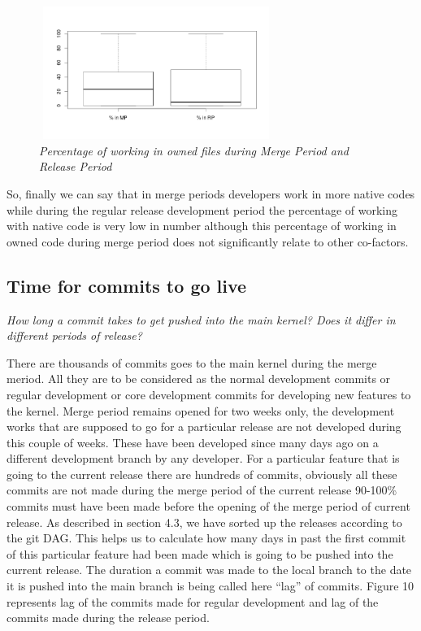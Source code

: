 \documentclass{acm_proc_article-sp}
\begin{document}
\begin{figure}
\begin{center}
\includegraphics[height=1.7in,width=3in]{ownpMPRPbox.png}
\caption{\small \sl Percentage of working in owned files during Merge Period and Release Period}
\end{center}
\end{figure}

So, finally we can say that in merge periods developers work in more native codes while during the regular release development period the percentage of working with native code is very low in number although this percentage of working in owned code during merge period does not significantly relate to other co-factors.

\subsection{Time for commits to go live}
\textit{How long a commit takes to get pushed into the main kernel? Does it differ in different periods of release?}

There are thousands of commits goes to the main kernel during the merge meriod. All they are to be considered as the normal development commits or regular development or core development commits for developing new features to the kernel. Merge period remains opened for two weeks only, the development works that are supposed to go for a particular release are not developed during this couple of weeks. These have been developed since many days ago on a different development branch by any developer. For a particular feature that is going to the current release there are hundreds of commits, obviously all these commits are not made during the merge period of the current release 90-100\% commits must have been made before the opening of the merge period of current release. As described in section 4.3, we have sorted up the releases according to the git DAG. This helps us to calculate how many days in past the first commit of this particular feature had been made which is going to be pushed into the current release. The duration a commit was made to the local branch to the date it is pushed into the main branch is being called here ``lag'' of commits. Figure 10 represents lag of the commits made for regular development and lag of the commits made during the release period.
\end{document}
